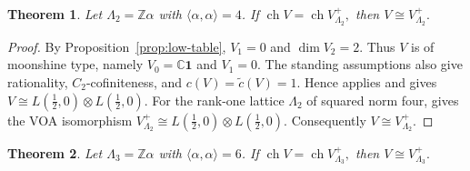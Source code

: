 \documentclass[12pt,leqno]{amsart}
\numberwithin{equation}{section} \newtheorem{thm}{Theorem}[section] \newtheorem{lem}[thm]{Lemma} \newtheorem{ex}[thm]{Example} \newtheorem{prop}[thm]{Proposition} \newtheorem{cor}[thm]{Corollary} \newtheorem{defi}[thm]{Definition} \newtheorem{rmk}[thm]{Remark} \newtheorem{notation}[thm]{Notation}
\newcommand{\one}{\mathbf{1}}
\newcommand{\ch}{\operatorname{ch}}
\def\Z{\mathbb{Z}} \def\N{\mathbb{N}} \def\A{\mathbb{A}} \def\C{\mathbb{C}} \def\R{\mathbb{R}} \def\Q{\mathbb{Q}} \def\F{\mathbb{F}}
\begin{document}
\begin{thm}\label{thm:k2}
Let $\Lambda_2=\Z\alpha$ with $\langle\alpha,\alpha\rangle=4$. If \(\ch V=\ch V_{\Lambda_2}^+,\) then \(V\cong V_{\Lambda_2}^+.\)
\end{thm}

\begin{proof}
By Proposition~\ref{prop:low-table}, \(V_1=0\) and $\dim V_2=2$. Thus $V$ is of moonshine type, namely $V_0=\C\one$ and $V_1=0$. The standing assumptions also give rationality, $C_2$-cofiniteness, and $c(V)=\widetilde c(V)=1$. Hence \cite[Theorem~4.7]{ZhangDong} applies and gives \(V\cong L\!\left(\frac12,0\right)\otimes L\!\left(\frac12,0\right).\) For the rank-one lattice $\Lambda_2$ of squared norm four, \cite[Remark~3.2]{DG98} gives the VOA isomorphism \(V_{\Lambda_2}^+\cong L\!\left(\frac12,0\right)\otimes L\!\left(\frac12,0\right).\) Consequently $V\cong V_{\Lambda_2}^+$.
\end{proof}

\begin{thm}\label{thm:k3}
Let $\Lambda_3=\Z\alpha$ with $\langle\alpha,\alpha\rangle=6$. If \(\ch V=\ch V_{\Lambda_3}^+,\) then \(V\cong V_{\Lambda_3}^+.\)
\end{thm}
\end{document}

